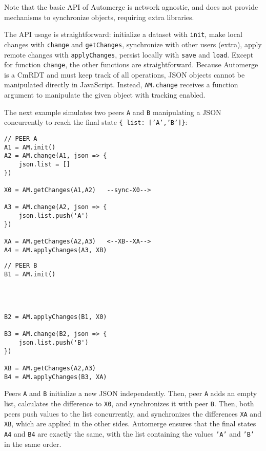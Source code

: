 \documentclass[12pt]{article}
\newcommand{\code}[1]  {\texttt{\footnotesize{#1}}}
\begin{document}
Note that the basic API of Automerge is network agnostic, and does not provide
mechanisms to synchronize objects, requiring extra libraries.

The API usage is straightforward:
    initialize a dataset with \code{init},
    make local changes with \code{change} and \code{getChanges},
    synchronize with other users (extra),
    apply remote changes with \code{applyChanges},
    persist locally with \code{save} and \code{load}.
Except for function \code{change}, the other functions are straightforward.
%
Because Automerge is a CmRDT and must keep track of all operations, JSON
objects cannot be manipulated directly in JavaScript.
Instead, \code{AM.change} receives a function argument to manipulate
the given object with tracking enabled.

The next example simulates two peers \code{A} and \code{B} manipulating a
JSON concurrently to reach the final state \code{\{ list: ['A','B']\}}:

\noindent
{\footnotesize
\begin{minipage}[t]{0.6\textwidth}
\begin{verbatim}
// PEER A
A1 = AM.init()
A2 = AM.change(A1, json => {
    json.list = []
})

X0 = AM.getChanges(A1,A2)   --sync-X0-->

A3 = AM.change(A2, json => {
    json.list.push('A')
})

XA = AM.getChanges(A2,A3)   <--XB--XA-->
A4 = AM.applyChanges(A3, XB)
\end{verbatim}
\end{minipage}
\begin{minipage}[t]{0.4\textwidth}
\begin{verbatim}
// PEER B
B1 = AM.init()




B2 = AM.applyChanges(B1, X0)

B3 = AM.change(B2, json => {
    json.list.push('B')
})

XB = AM.getChanges(A2,A3)
B4 = AM.applyChanges(B3, XA)
\end{verbatim}
\end{minipage}
}

Peers \code{A} and \code{B} initialize a new JSON independently.
Then, peer \code{A} adds an empty list, calculates the difference to \code{X0},
and synchronizes it with peer \code{B}.
Then, both peers push values to the list concurrently, and synchronizes the
differences \code{XA} and \code{XB}, which are applied in the other sides.
Automerge ensures that the final states \code{A4} and \code{B4} are exactly the
same, with the list containing the values \code{'A'} and \code{'B'} in the
same order.
\end{document}

